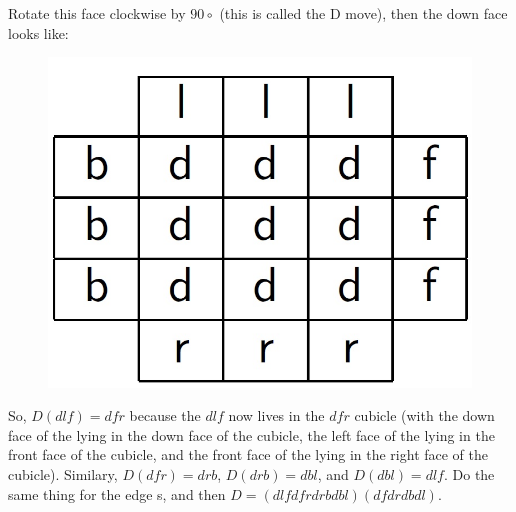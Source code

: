 Rotate this face clockwise by $90\circ$ (this is called the D move), then the down face looks like:

\begin{figure}[h]
	\centering
		\includegraphics[scale=0.2]{input/pics/rubiks2.jpg}
		\caption{}
	\label{fig:rubiks2}
\end{figure}

So, $D(dlf) = dfr$ because the $dlf$ \cpiece{} now lives in the $dfr$ cubicle (with the down face of the \cpiece{} lying in the down
face of the cubicle, the left face of the \cpiece{} lying in the front face of the cubicle, and the front face of the \cpiece{} lying
in the right face of the cubicle). Similary, $D(dfr) = drb$, $D(drb) = dbl$, and $D(dbl) = dlf$. Do the same thing
for the edge \cpiece{}s, and then $D = (dlf dfr drb dbl)(df dr db dl)$.


\myTail{
}
%